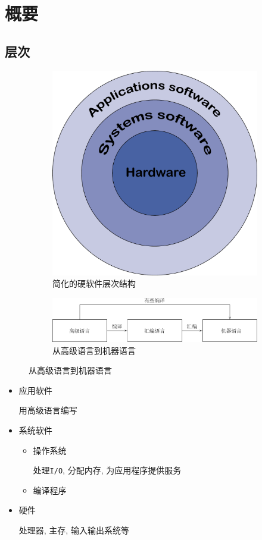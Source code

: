 \chapter{概要}
\section{层次}
\begin{figure}[H]
\centering
\begin{subfigure}{.48\textwidth}
\centering
\includegraphics[scale=.2]{img/figure17.pdf}
\caption{简化的硬软件层次结构}
\end{subfigure}
\begin{subfigure}{.48\textwidth}
\centering
\includegraphics[scale=.3]{img/figure18.pdf}
\caption{从高级语言到机器语言}
\end{subfigure}
\end{figure}
\begin{itemize}
\item 应用软件 \par 用高级语言编写
\item 系统软件
\begin{itemize}
\item 操作系统 \par 处理\verb|I/O|, 分配内存, 为应用程序提供服务
\item 编译程序
\end{itemize}
\item 硬件 \par 处理器, 主存, 输入输出系统等
\end{itemize}
